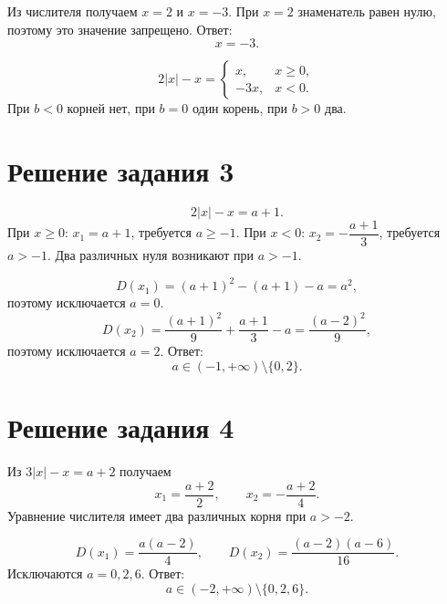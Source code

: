 \clearpage
{}

\begin{teacheranswer}[Задание 1]
  Из числителя получаем \(x=2\) и \(x=-3\). При \(x=2\) знаменатель
  равен нулю, поэтому это значение запрещено. Ответ:
  \[
    \boxed{x=-3}.
  \]
\end{teacheranswer}

\begin{teacheranswer}[Задание 2]
  \[
    2|x|-x=
    \begin{cases}
      x,&x\ge0,\\
      -3x,&x<0.
    \end{cases}
  \]
  При \(b<0\) корней нет, при \(b=0\) один корень, при \(b>0\) два.
\end{teacheranswer}

\section*{Решение задания 3}

\begin{teacheranswer}[Числитель]
  \[
    2|x|-x=a+1.
  \]
  При \(x\ge0\): \(x_1=a+1\), требуется \(a\ge-1\).
  При \(x<0\): \(x_2=-\dfrac{a+1}{3}\), требуется \(a>-1\).
  Два различных нуля возникают при \(a>-1\).
\end{teacheranswer}

\begin{teacheranswer}
  \[
    D(x_1)=(a+1)^2-(a+1)-a=a^2,
  \]
  поэтому исключается \(a=0\).
  \[
    D(x_2)=\frac{(a+1)^2}{9}+\frac{a+1}{3}-a
           =\frac{(a-2)^2}{9},
  \]
  поэтому исключается \(a=2\). Ответ:
  \[
    \boxed{a\in(-1,+\infty)\setminus\{0,2\}}.
  \]
\end{teacheranswer}

\section*{Решение задания 4}

\begin{teacheranswer}[Числитель]
  Из \(3|x|-x=a+2\) получаем
  \[
    x_1=\frac{a+2}{2},
    \qquad
    x_2=-\frac{a+2}{4}.
  \]
  Уравнение числителя имеет два различных корня при \(a>-2\).
\end{teacheranswer}

\begin{teacheranswer}
  \[
    D(x_1)=\frac{a(a-2)}4,
    \qquad
    D(x_2)=\frac{(a-2)(a-6)}{16}.
  \]
  Исключаются \(a=0,2,6\). Ответ:
  \[
    \boxed{a\in(-2,+\infty)\setminus\{0,2,6\}}.
  \]
\end{teacheranswer}

